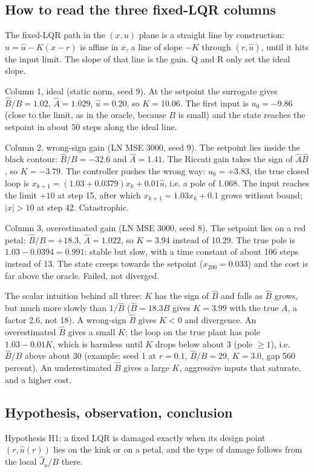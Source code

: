 \documentclass[11pt]{article}
\begin{document}
\subsection{How to read the three fixed-LQR columns}
The fixed-LQR path in the $(x,u)$ plane is a straight line by construction: $u=\hat u-K(x-r)$ is affine in $x$, a line of slope $-K$ through $(r,\hat u)$, until it hits the input limit. The slope of that line is the gain. Q and R only set the ideal slope.

Column 1, ideal (static norm, seed 9). At the setpoint the surrogate gives $\hat B/B=1.02$, $\hat A=1.029$, $\hat u=0.20$, so $K=10.06$. The first input is $u_0=-9.86$ (close to the limit, as in the oracle, because $B$ is small) and the state reaches the setpoint in about 50 steps along the ideal line.

Column 2, wrong-sign gain (LN MSE 3000, seed 9). The setpoint lies inside the black contour: $\hat B/B=-32.6$ and $\hat A=1.41$. The Riccati gain takes the sign of $\hat A\hat B$, so $K=-3.79$. The controller pushes the wrong way: $u_0=+3.83$, the true closed loop is $x_{k+1}=(1.03+0.0379)x_k+0.01\hat u$, i.e. a pole of 1.068. The input reaches the limit $+10$ at step 15, after which $x_{k+1}=1.03x_k+0.1$ grows without bound; $|x|>10$ at step 42. Catastrophic.

Column 3, overestimated gain (LN MSE 3000, seed 8). The setpoint lies on a red petal: $\hat B/B=+18.3$, $\hat A=1.022$, so $K=3.94$ instead of 10.29. The true pole is $1.03-0.0394=0.991$: stable but slow, with a time constant of about 106 steps instead of 13. The state creeps towards the setpoint ($x_{200}=0.033$) and the cost is far above the oracle. Failed, not diverged.

The scalar intuition behind all three: $K$ has the sign of $\hat B$ and falls as $\hat B$ grows, but much more slowly than $1/\hat B$ ($\hat B=18.3B$ gives $K=3.99$ with the true $A$, a factor 2.6, not 18). A wrong-sign $\hat B$ gives $K<0$ and divergence. An overestimated $\hat B$ gives a small $K$; the loop on the true plant has pole $1.03-0.01K$, which is harmless until $K$ drops below about 3 (pole $\ge1$), i.e. $\hat B/B$ above about 30 (example: seed 1 at $r=0.1$, $\hat B/B=29$, $K=3.0$, gap 560 percent). An underestimated $\hat B$ gives a large $K$, aggressive inputs that saturate, and a higher cost.

\subsection{Hypothesis, observation, conclusion}
Hypothesis H1: a fixed LQR is damaged exactly when its design point $(r,\hat u(r))$ lies on the kink or on a petal, and the type of damage follows from the local $\hat J_u/B$ there.
\end{document}
